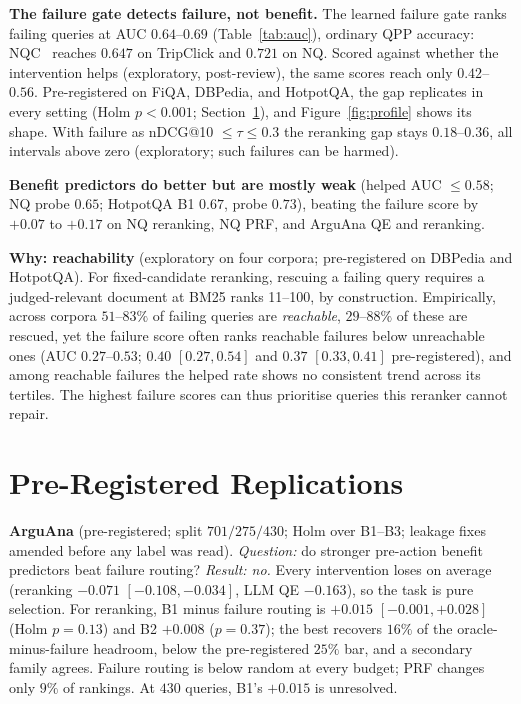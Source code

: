 \documentclass[sigconf,anonymous,review]{acmart}
\begin{document}
\textbf{The failure gate detects failure, not benefit.}
The learned failure gate ranks failing queries at AUC
$0.64$--$0.69$ (Table~\ref{tab:auc}), ordinary QPP accuracy: NQC~\cite{nqc}
reaches $0.647$ on TripClick and $0.721$ on NQ. Scored against whether the
intervention helps (exploratory, post-review), the same scores reach
only $0.42$--$0.56$.
Pre-registered on FiQA, DBPedia, and HotpotQA, the gap replicates
in every setting (Holm $p<0.001$; Section~\ref{sec:arguana}), and
Figure~\ref{fig:profile} shows its shape. With failure as
nDCG@10 $\le\tau\le0.3$ the reranking gap stays $0.18$--$0.36$, all
intervals above zero (exploratory; such failures can be harmed).

\textbf{Benefit predictors do better but are mostly weak}
(helped AUC $\le0.58$; NQ probe $0.65$; HotpotQA B1 $0.67$, probe
$0.73$), beating the failure score by $+0.07$ to $+0.17$ on NQ
reranking, NQ PRF, and ArguAna QE and reranking.


\textbf{Why: reachability} (exploratory on four corpora;
pre-registered on DBPedia and HotpotQA). For fixed-candidate reranking, rescuing a failing query
requires a judged-relevant document at BM25 ranks 11--100, by
construction. Empirically, across corpora $51$--$83\%$ of failing
queries are \emph{reachable}, $29$--$88\%$ of these are rescued,
yet the failure score often ranks reachable failures below
unreachable ones (AUC $0.27$--$0.53$; $0.40$ $[0.27,0.54]$ and $0.37$
$[0.33,0.41]$ pre-registered), and among reachable failures the helped
rate shows no consistent trend across its tertiles. The highest
failure scores can thus prioritise queries this reranker cannot
repair.

\section{Pre-Registered Replications}
\label{sec:arguana}


\textbf{ArguAna} (pre-registered; split $701/275/430$; Holm over
B1--B3; leakage fixes amended before any label was read). \emph{Question:} do stronger pre-action benefit predictors beat
failure routing? \emph{Result: no.} Every intervention loses on average
(reranking $-0.071$ $[-0.108,-0.034]$, LLM QE $-0.163$), so the task is
pure selection. For reranking, B1 minus failure routing is $+0.015$
$[-0.001,+0.028]$ (Holm $p=0.13$) and B2 $+0.008$ ($p=0.37$); the best
recovers $16\%$ of the oracle-minus-failure headroom, below the
pre-registered $25\%$ bar, and a secondary family agrees. Failure
routing is below random at every budget; PRF changes only $9\%$ of
rankings. At $430$ queries, B1's $+0.015$ is unresolved.
\end{document}
